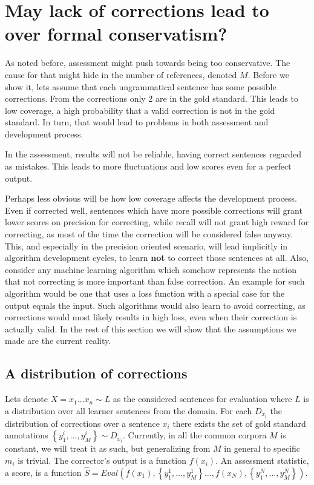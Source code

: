 \documentclass[english]{article}
\begin{document}
\section{May lack of corrections lead to over formal conservatism?\label{sec:increase-reference}}

As noted before, assessment might push towards being too conservative. The cause for that
might hide in the number of references, denoted $M$. Before we show it, lets assume
that each ungrammatical sentence has some possible corrections. From
the corrections only 2 are in the gold standard. This leads to low coverage, a high probability that a valid correction is not in the gold standard. In turn, that would lead to
problems in both assessment and development process. 

In the assessment,
results will not be reliable, having correct sentences regarded as mistakes. This leads to more fluctuations and low scores even for a perfect output.

Perhaps less obvious will be how low coverage affects the development
process. Even if corrected well, sentences which have more possible
corrections will grant lower scores on precision for correcting, while recall will not grant high reward for correcting, as most of the time the correction will be considered false anyway. This, and especially in the precision oriented scenario, will lead implicitly in algorithm development cycles, to learn \textbf{not} to correct those sentences at all. Also, consider any machine learning algorithm which somehow represents the notion that not correcting is more important than false correction. An example for such algorithm would be one that uses a loss function with a special case for the output equals the input. Such algorithms would also learn to avoid correcting, as corrections would most likely results in high loss, even when their correction is actually valid.
In the rest of this section we will show that the assumptions we made are the current reality. 

\subsection{A distribution of corrections}

Lets denote $X=x_{1}\ldots x_n\sim L$ as the considered
sentences for evaluation where $L$ is a distribution over all learner sentences from the domain. 
For each $D_{x_i}$ the distribution of corrections over a sentence $x_i$ there exists the set of gold standard annotations $\left\{ y_{1}^{i},\ldots,y_{M}^{i}\right\} \sim D_{x_i}$. Currently, in all the common corpora $M$ is constant, we will treat it as such, but generalizing from $M$ in general to specific $m_i$ is trivial. The corrector's output is a function $f\left(x_{i}\right)$. An assessment statistic, a score, is a function $\hat{S}=Eval\left(f\left(x_{1}\right),\left\{ y_{1}^{1},\ldots,y_{M}^{1}\right\} \ldots,f\left(x_{N}\right),\left\{ y_{1}^{N},\ldots,y_{M}^{N}\right\} \right)$.
\end{document}
